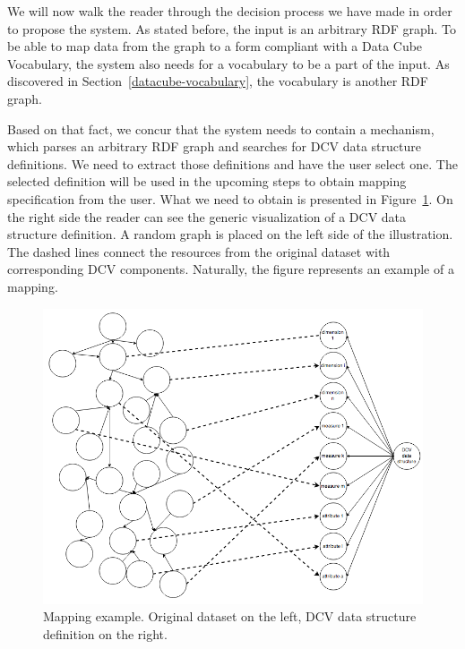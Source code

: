 We will now walk the reader through the decision process we have made in order to propose 
the system. As stated before, the input is an arbitrary RDF graph. To 
be able to map data from the graph to a form compliant with a Data 
Cube Vocabulary, the system also needs for a vocabulary to be a part of the input. 
As discovered in Section~\ref{datacube-vocabulary}, the vocabulary is another 
RDF graph.

Based on that fact, we concur that the system needs to contain a mechanism, which 
parses an arbitrary RDF graph and searches for DCV data structure definitions. 
We need to extract those definitions and have the user select one. The selected 
definition will be used in the upcoming steps to obtain mapping specification from 
the user. What we need to obtain is presented in 
Figure~\ref{fig:mapping-example}. On the right side the reader can see the 
generic visualization of a DCV data structure definition. A random graph is 
placed on the left side of the illustration. The dashed lines connect the resources 
from the original dataset with corresponding DCV components. Naturally, the 
figure represents an example of a mapping.

\begin{figure}
	\centering
	\includegraphics[width=140mm]{img/mapping-example.png}
	\caption{Mapping example. Original dataset on the left, DCV data structure definition on the right.}
	\label{fig:mapping-example}
\end{figure}

